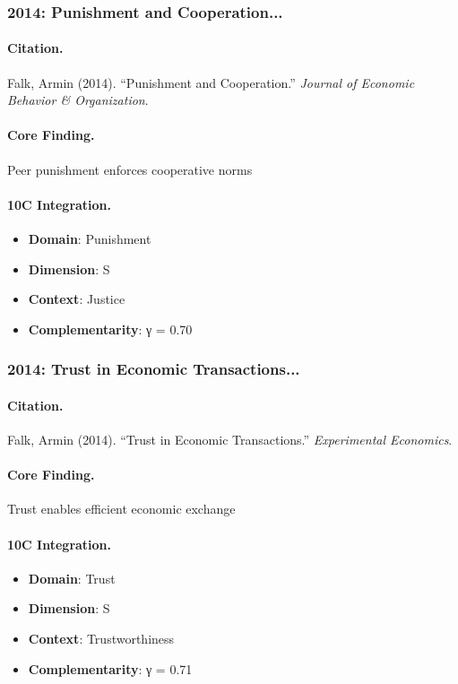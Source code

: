 \subsubsection{2014: Punishment and Cooperation...}

\paragraph{Citation.}
Falk, Armin (2014). ``Punishment and Cooperation.''
\textit{Journal of Economic Behavior & Organization}.

\paragraph{Core Finding.}
Peer punishment enforces cooperative norms

\paragraph{10C Integration.}
\begin{itemize}[nosep]
  \item \textbf{Domain}: Punishment
  \item \textbf{Dimension}: S
  \item \textbf{Context}: Justice
  \item \textbf{Complementarity}: γ = 0.70
\end{itemize}


\subsubsection{2014: Trust in Economic Transactions...}

\paragraph{Citation.}
Falk, Armin (2014). ``Trust in Economic Transactions.''
\textit{Experimental Economics}.

\paragraph{Core Finding.}
Trust enables efficient economic exchange

\paragraph{10C Integration.}
\begin{itemize}[nosep]
  \item \textbf{Domain}: Trust
  \item \textbf{Dimension}: S
  \item \textbf{Context}: Trustworthiness
  \item \textbf{Complementarity}: γ = 0.71
\end{itemize}


